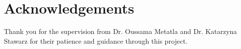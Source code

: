 
\section*{Acknowledgements}

Thank you for the supervision from Dr. Oussama Metatla and Dr. Katarzyna Stawarz for their patience and guidance through this project.
